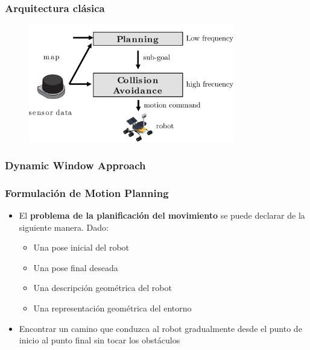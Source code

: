 \begin{frame}
	\frametitle{Arquitectura clásica}
	
	\begin{figure}[!h]
		\includegraphics[width=0.8\textwidth]{images/path_planning_architecture.pdf}
	\end{figure}
	
\end{frame}


\begin{frame}
	\frametitle{Dynamic Window Approach}
	
	
	
	
\end{frame}

\begin{frame}
	\frametitle{Formulación de Motion Planning}

	\begin{itemize}
		\item El {\bf problema de la planificación del movimiento} se puede declarar de la siguiente manera. Dado:
		\begin{itemize}
			\item Una pose inicial del robot
			\item Una pose final deseada
			\item Una descripción geométrica del robot
			\item Una representación geométrica del entorno
		\end{itemize}
		\item Encontrar un camino que conduzca al robot gradualmente desde el punto de inicio al punto final sin tocar los obstáculos
	\end{itemize}
\end{frame}

